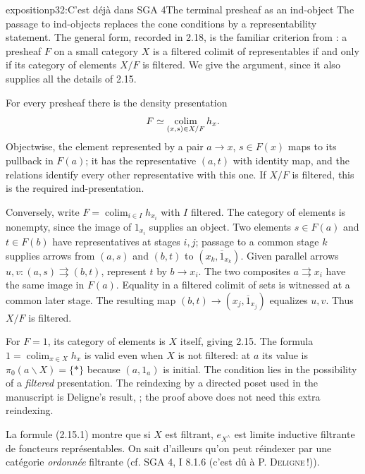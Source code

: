 \begin{dcomment}{exposition}{p32:C'est déjà dans SGA 4}{The terminal presheaf as an ind-object}
The passage to ind-objects replaces the cone conditions by a representability statement. The general form, recorded in 2.18, is the familiar criterion from \citet[Expos\'e I, Theorem 8.3.3]{SGA4I1972}: a presheaf $F$ on a small category $X$ is a filtered colimit of representables if and only if its category of elements $X/F$ is filtered. We give the argument, since it also supplies all the details of 2.15.

For every presheaf there is the density presentation
\[
 F\simeq\mathop{\rm colim}_{(x,s)\in X/F}h_x.
\]
Objectwise, the element represented by a pair $a\to x$, $s\in F(x)$ maps to its pullback in $F(a)$; it has the representative $(a,t)$ with identity map, and the relations identify every other representative with this one. If $X/F$ is filtered, this is the required ind-presentation.

Conversely, write $F=\operatorname{colim}_{i\in I}h_{x_i}$ with $I$ filtered. The category of elements is nonempty, since the image of $1_{x_i}$ supplies an object. Two elements $s\in F(a)$ and $t\in F(b)$ have representatives at stages $i,j$; passage to a common stage $k$ supplies arrows from $(a,s)$ and $(b,t)$ to $(x_k,\overline{1}_{x_k})$. Given parallel arrows $u,v:(a,s)\rightrightarrows(b,t)$, represent $t$ by $b\to x_i$. The two composites $a\rightrightarrows x_i$ have the same image in $F(a)$. Equality in a filtered colimit of sets is witnessed at a common later stage. The resulting map $(b,t)\to(x_j,\overline{1}_{x_j})$ equalizes $u,v$. Thus $X/F$ is filtered.

For $F=1$, its category of elements is $X$ itself, giving 2.15. The formula $1=\operatorname{colim}_{x\in X}h_x$ is valid even when $X$ is not filtered: at $a$ its value is $\pi _0(a\backslash X)=\{*\}$ because $(a,1_a)$ is initial. The condition lies in the possibility of a \emph{filtered} presentation. The reindexing by a directed poset used in the manuscript is Deligne's result, \citet[Expos\'e I, Proposition 8.1.6]{SGA4I1972}; the proof above does not need this extra reindexing.
\end{dcomment}


La formule (2.15.1) montre que si  $X$ est filtrant, $e_{X^\wedge}$ est limite inductive filtrante de foncteurs représentables. On sait d'ailleurs qu'on peut réindexer par une catégorie \textit{ordonnée} filtrante (cf. SGA 4, I 8.1.6 (c'est dû à P. \textsc{Deligne}\,!)).

